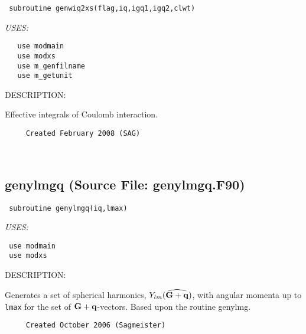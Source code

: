\documentclass[11pt]{article}
\begin{document}
\begin{verbatim} subroutine genwiq2xs(flag,iq,igq1,igq2,clwt)\end{verbatim}{\em USES:}
\begin{verbatim}   use modmain
   use modxs
   use m_genfilname
   use m_getunit\end{verbatim}
{\sf DESCRIPTION:\\ }


     Effective integrals of Coulomb interaction.
  
\begin{verbatim}     Created February 2008 (SAG)\end{verbatim}


 
 
\mbox{}\hrulefill\ 
 
\subsection{genylmgq (Source File: genylmgq.F90)}


\begin{verbatim} subroutine genylmgq(iq,lmax)\end{verbatim}{\em USES:}
\begin{verbatim} use modmain
 use modxs\end{verbatim}
{\sf DESCRIPTION:\\ }


     Generates a set of spherical harmonics, $Y_{lm}(\widehat{{\bf G}+{\bf q}})$,
     with angular
     momenta up to {\tt lmax} for the set of ${\bf G+q}$-vectors. Based upon
     the routine genylmg.
  
\begin{verbatim}     Created October 2006 (Sagmeister)\end{verbatim}







\end{document}
